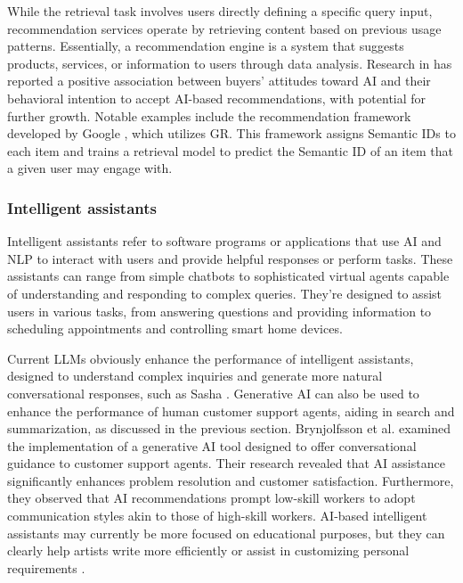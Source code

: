 \documentclass[11pt,a4paper]{article}
\begin{document}

While the retrieval task involves users directly defining a specific query input, recommendation services operate by retrieving content based on previous usage patterns. Essentially, a recommendation engine is a system that suggests products, services, or information to users through data analysis. Research in \cite{CHUA:AI:2023} has reported a positive association between buyers' attitudes toward AI and their behavioral intention to accept AI-based recommendations, with potential for further growth. Notable examples include the recommendation framework developed by Google \cite{Rajput:recommender:2023}, which utilizes GR. This framework assigns Semantic IDs to each item and trains a retrieval model to predict the Semantic ID of an item that a given user may engage with.

\subsubsection{Intelligent assistants}

Intelligent assistants refer to software programs or applications that use AI and NLP to interact with users and provide helpful responses or perform tasks. These assistants can range from simple chatbots to sophisticated virtual agents capable of understanding and responding to complex queries. They're designed to assist users in various tasks, from answering questions and providing information to scheduling appointments and controlling smart home devices.

Current LLMs obviously enhance the performance of intelligent assistants, designed to understand complex inquiries and generate more natural conversational responses, such as Sasha \cite{King:Sasha:2024}. Generative AI can also be used to enhance the performance of human customer support agents, aiding in search and summarization, as discussed in the previous section. Brynjolfsson et al. \cite{brynjolfsson:generative:2023} examined the implementation of a generative AI tool designed to offer conversational guidance to customer support agents. Their research revealed that AI assistance significantly enhances problem resolution and customer satisfaction. Furthermore, they observed that AI recommendations prompt low-skill workers to adopt communication styles akin to those of high-skill workers. AI-based intelligent assistants may currently be more focused on educational purposes, but they can clearly help artists write more efficiently \cite{Lee:design:2024} or assist in customizing personal requirements \cite{sajja2024ai}.
 
\end{document}

